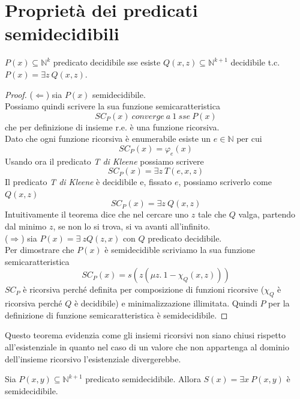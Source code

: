 %
%

\section{Proprietà dei predicati semidecidibili}

\begin{thm}
$P(x)\subseteq\mathbb{N}^{k}$ predicato decidibile sse esiste $Q(x,z)\subseteq\mathbb{N}^{k+1}$ decidibile t.c. $P(x)=\exists z\ Q(x,z)$.
\end{thm}

\begin{proof}
($\Leftarrow$) sia $P(x)$ semidecidibile.\\
Possiamo quindi scrivere la sua funzione semicaratteristica
$$SC_{P}(x)\ converge\ a\ 1\ sse\ P(x)$$
che per definizione di insieme r.e. \`{e} una funzione ricorsiva.\\
Dato che ogni funzione ricorsiva \`{e} enumerabile esiste un $e\in\mathbb{N}$ per cui
$$SC_{P}(x)=\varphi_{e}(x)$$
Usando ora il predicato \textit{T di Kleene} possiamo scrivere
$$SC_{P}(x)=\exists z\ T(e,x,z)$$
Il predicato \textit{T di Kleene} \`{e} decidibile e, fissato $e$, possiamo scriverlo come $Q(x,z)$
$$SC_{P}(x)=\exists z\ Q(x,z)$$
Intuitivamente il teorema dice che nel cercare uno $z$ tale che $Q$ valga, partendo dal minimo $z$, se non lo si trova, si va avanti all'infinito.\\

($\Rightarrow$) sia $P(x)=\exists\ z Q(z,x)$ con $Q$ predicato decidibile.\\
Per dimostrare che $P(x)$ \`{e} semidecidible scriviamo la sua funzione semicaratteristica
$$SC_{P}(x)=s(z(\mu z.\ 1-\chi_{Q}(x,z)))$$
$SC_{P}$ \`{e} ricorsiva perch\'{e} definita per composizione di funzioni ricorsive ($\chi_{Q}$ \`{e} ricorsiva perch\'{e} $Q$ \`{e} decidibile) e minimalizzazione illimitata.
Quindi $P$ per la definizione di funzione semicaratteristica \`{e} semidecidibile.
\end{proof}
Questo teorema evidenzia come gli insiemi ricorsivi non siano chiusi rispetto all'esistenziale in quanto nel caso di un valore che non appartenga al dominio dell'insieme ricorsivo l'esistenziale divergerebbe.

\begin{thm}
Sia $P(x,y) \subseteq\mathbb{N}^{k+1}$ predicato semidecidibile. Allora $S(x) = \exists x\ P(x,y)$ \`{e} semidecidibile.
\end{thm}

